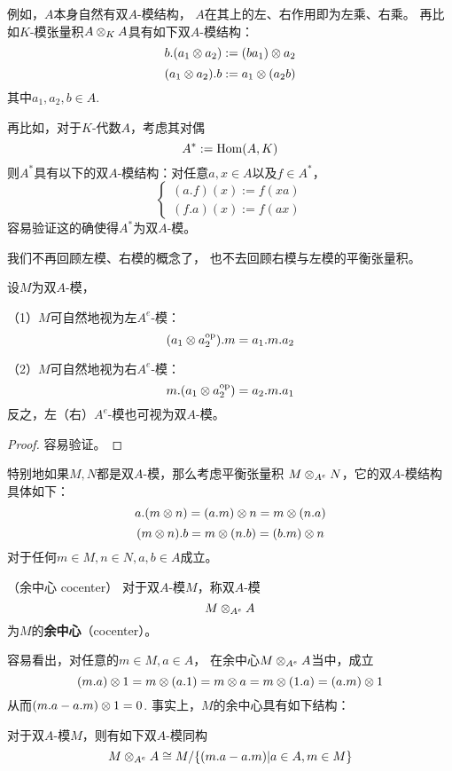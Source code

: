 例如，$A$本身自然有双$A$-模结构，
$A$在其上的左、右作用即为左乘、右乘。
再比如$K$-模张量积$A\otimes_KA$具有如下双$A$-模结构：
$$b.(a_1\otimes a_2):=(ba_1)\otimes a_2$$
$$(a_1\otimes a_2).b:=a_1\otimes(a_2b)$$
其中$a_1,a_2,b\in A$.

再比如，对于$K$-代数$A$，考虑其对偶
$$A^*:=\operatorname{Hom}(A,K)$$
则$A^*$具有以下的双$A$-模结构：对任意$a,x\in A$以及$f\in A^*$，
$$
  \left\{
    \begin{array}{l}
      (a.f)(x):=f(xa)\\
      (f.a)(x):=f(ax)
    \end{array}
  \right.
$$
容易验证这的确使得$A^*$为双$A$-模。\vs

我们不再回顾左模、右模的概念了，
也不去回顾右模与左模的平衡张量积。

\begin{prop}设$M$为双$A$-模，

（1）$M$可自然地视为左$A^e$-模：
$$(a_1\otimes a_2^{\text{op}}).m=a_1.m.a_2$$

（2）$M$可自然地视为右$A^e$-模：
$$m.(a_1\otimes a_2^{\text{op}})=a_2.m.a_1$$
反之，左（右）$A^e$-模也可视为双$A$-模。
\end{prop}

\begin{proof}
容易验证。
\end{proof}

特别地如果$M,N$都是双$A$-模，那么考虑平衡张量积
$M\otimes_{A^e}N$，它的双$A$-模结构具体如下：
$$a.(m\otimes n)=(a.m)\otimes n=m\otimes(n.a)$$
$$(m\otimes n).b=m\otimes (n.b)=(b.m)\otimes n$$
对于任何$m\in M,n\in N,a,b\in A$成立。

\begin{definition}（余中心 cocenter）
对于双$A$-模$M$，称双$A$-模
$$M\otimes_{A^e}A$$
为$M$的\textbf{余中心}（cocenter）。
\end{definition}

容易看出，对任意的$m\in M,a\in A$，
在余中心$M\otimes_{A^e}A$当中，成立
$$(m.a)\otimes 1=m\otimes(a.1)=m\otimes a=m\otimes(1.a)=(a.m)\otimes 1$$
从而$(m.a-a.m)\otimes 1=0$.
事实上，$M$的余中心具有如下结构：

\begin{prop}
对于双$A$-模$M$，则有如下双$A$-模同构
$$M\otimes_{A^e}A\cong M/\{(m.a-a.m)|a\in A,m\in M\}$$
\label{双模的余中心的结构prop}
\end{prop}

